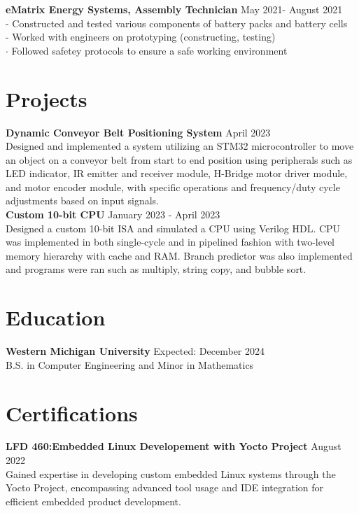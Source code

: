 \documentclass[a4paper,12pt]{article}
\begin{document}
\vspace{-.5cm} \noindent \textbf{eMatrix Energy Systems, Assembly Technician}
\hfill May 2021- August 2021\\ - Constructed and tested various components of
battery packs and battery cells\\ - Worked with engineers on prototyping (constructing, testing)\\
$\cdot$ Followed safetey protocols to ensure a safe working environment
\vspace{-.5cm} \section*{Projects} \textbf{Dynamic Conveyor Belt Positioning
System} \hfill April 2023\\ Designed and implemented a system utilizing an STM32
microcontroller to move an object on a conveyor belt from start to end position
using peripherals such as LED indicator, IR emitter and receiver module,
H-Bridge motor driver module, and motor encoder module, with specific operations
and frequency/duty cycle adjustments based on input signals. \noindent\\
\textbf{Custom 10-bit CPU} \hfill January 2023 - April 2023\\ Designed a custom
10-bit ISA and simulated a CPU using Verilog HDL. CPU was implemented in both
single-cycle and in pipelined fashion with two-level memory hierarchy with cache
and RAM. Branch predictor was also implemented and programs were ran such as
multiply, string copy, and bubble sort.\\

\vspace{-.25cm}
\section*{Education} \textbf{Western Michigan University} \hfill Expected:
December 2024\\ B.S. in Computer Engineering and Minor
in Mathematics\\ 


\section*{Certifications} \textbf{LFD 460:Embedded Linux Developement with Yocto
Project} \hfill August 2022\\ \vspace{-.5cm}\vspace{.5cm}
Gained expertise in developing custom embedded Linux systems through the Yocto Project, encompassing advanced tool usage and IDE integration for efficient embedded product development.
\end{document}

